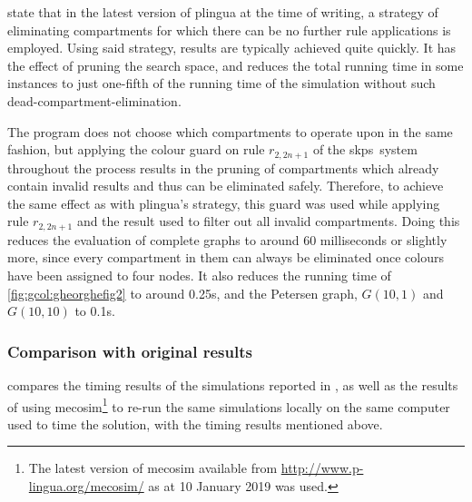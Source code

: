 \citeauthor{Gheorghe2013} state \cite[p.~828]{Gheorghe2013} that in the latest version of \gls{plingua} at the time of writing, a strategy of eliminating compartments for which there can be no further rule applications is employed.  Using said strategy, results are typically achieved quite quickly.  It has the effect of pruning the search space, and reduces the total running time in some instances to just one-fifth of the running time of the simulation without such dead-compartment-elimination.

The \fsharp{} program does not choose which compartments to operate upon in the same fashion, but applying the colour guard on rule \(r_{2,2n+1}\) of the \gls{skps}~system throughout the process results in the pruning of compartments which already contain invalid results and thus can be eliminated safely. Therefore, to achieve the same effect as with \gls{plingua}'s strategy, this guard was used while applying rule \(r_{2,2n+1}\) and the result used to filter out all invalid compartments.  Doing this reduces the evaluation of complete graphs to around 60 milliseconds or slightly more, since every compartment in them can always be eliminated once colours have been assigned to four nodes.  It also reduces the running time of \cref{fig:gcol:gheorghefig2} to around 0.25s, and the Petersen graph, \(G(10,1)\) and \(G(10,10)\) to 0.1s.

\subsubsection{Comparison with original results}

 compares the timing results of the simulations reported in \cite{Gheorghe2013}, as well as the results of using \gls{mecosim}\footnote{The latest version of \gls{mecosim} available from \url{http://www.p-lingua.org/mecosim/} as at 10 January 2019 was used.} \cite{Perez-Hurtado2010} to re-run the same simulations locally on the same computer used to time the \fsharp{} solution, with the timing results mentioned above.

